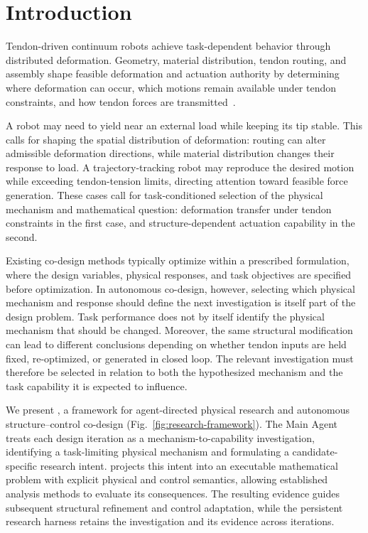 \section{Introduction}
\label{sec:introduction}

Tendon-driven continuum robots achieve task-dependent behavior through distributed deformation. Geometry, material distribution, tendon routing, and assembly shape feasible deformation and actuation authority by determining where deformation can occur, which motions remain available under tendon constraints, and how tendon forces are transmitted~\cite{rucker2011computing,stella2023stiffness}.

A robot may need to yield near an external load while keeping its tip stable. This calls for shaping the spatial distribution of deformation: routing can alter admissible deformation directions, while material distribution changes their response to load. A trajectory-tracking robot may reproduce the desired motion while exceeding tendon-tension limits, directing attention toward feasible force generation. These cases call for task-conditioned selection of the physical mechanism and mathematical question: deformation transfer under tendon constraints in the first case, and structure-dependent actuation capability in the second.

Existing co-design methods typically optimize within a prescribed formulation, where the design variables, physical responses, and task objectives are specified before optimization. In autonomous co-design, however, selecting which physical mechanism and response should define the next investigation is itself part of the design problem. Task performance does not by itself identify the physical mechanism that should be changed. Moreover, the same structural modification can lead to different conclusions depending on whether tendon inputs are held fixed, re-optimized, or generated in closed loop. The relevant investigation must therefore be selected in relation to both the hypothesized mechanism and the task capability it is expected to influence.

We present \softrobotagent{}, a framework for agent-directed physical research and autonomous structure--control co-design (Fig.~\ref{fig:research-framework}). The Main Agent treats each design iteration as a mechanism-to-capability investigation, identifying a task-limiting physical mechanism and formulating a candidate-specific research intent. \PPRP{} projects this intent into an executable mathematical problem with explicit physical and control semantics, allowing established analysis methods to evaluate its consequences. The resulting evidence guides subsequent structural refinement and control adaptation, while the persistent research harness retains the investigation and its evidence across iterations.

